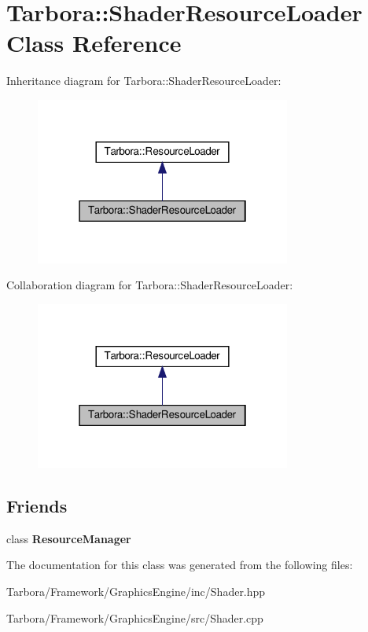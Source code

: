 \hypertarget{classTarbora_1_1ShaderResourceLoader}{}\section{Tarbora\+:\+:Shader\+Resource\+Loader Class Reference}
\label{classTarbora_1_1ShaderResourceLoader}


Inheritance diagram for Tarbora\+:\+:Shader\+Resource\+Loader\+:\nopagebreak
\begin{figure}[H]
\begin{center}
\leavevmode
\includegraphics[width=238pt]{classTarbora_1_1ShaderResourceLoader__inherit__graph}
\end{center}
\end{figure}


Collaboration diagram for Tarbora\+:\+:Shader\+Resource\+Loader\+:\nopagebreak
\begin{figure}[H]
\begin{center}
\leavevmode
\includegraphics[width=238pt]{classTarbora_1_1ShaderResourceLoader__coll__graph}
\end{center}
\end{figure}
\subsection*{Friends}
\begin{DoxyCompactItemize}
\item 
\mbox{\label{classTarbora_1_1ShaderResourceLoader_a54c1252abc87a78a301e6b6984470408}} 
class {\bfseries Resource\+Manager}
\end{DoxyCompactItemize}


The documentation for this class was generated from the following files\+:\begin{DoxyCompactItemize}
\item 
Tarbora/\+Framework/\+Graphics\+Engine/inc/Shader.\+hpp\item 
Tarbora/\+Framework/\+Graphics\+Engine/src/Shader.\+cpp\end{DoxyCompactItemize}
